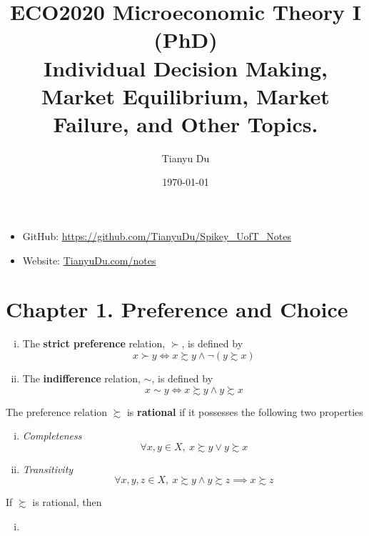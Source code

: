 \documentclass{article}
\title{ECO2020 Microeconomic Theory I (PhD) \\ \small Individual Decision Making, Market Equilibrium, Market Failure, and Other Topics.}
\date{\today}
\author{Tianyu Du}
\begin{document}
	\maketitle
	\doclicenseThis
	\begin{itemize}
		\item GitHub: \url{https://github.com/TianyuDu/Spikey_UofT_Notes}
		\item Website: \url{TianyuDu.com/notes}
	\end{itemize}
	\tableofcontents
	\newpage
	
	\section{Chapter 1. Preference and Choice}
		\begin{definition} \quad
			\begin{enumerate}[(i)]
				\item The \textbf{strict preference} relation, $\succ$, is defined by
					\begin{equation}
						x \succ y \iff x \succsim y \land \neg (y \succsim x)
					\end{equation}
				\item The \textbf{indifference} relation, $\sim$, is defined by
					\begin{equation}
						x \sim y \iff x \succsim y \land y \succsim x
					\end{equation}
			\end{enumerate}
		\end{definition}
	
		\begin{definition}[1.B.1]
			The preference relation $\succsim$ is \textbf{rational} if it possesses the following two properties
			\begin{enumerate}[(i)]
				\item \emph{Completeness} 
					\begin{equation}
						\forall x, y \in X,\ x \succsim y \lor y \succsim x
					\end{equation}
				\item \emph{Transitivity}
					\begin{equation}
						\forall x, y, z \in X,\ x \succsim y \land y \succsim z \implies x \succsim z
					\end{equation}
			\end{enumerate}
		\end{definition}
	
		\begin{proposition}[1.B.1]
			If $\succsim$ is rational, then
			\begin{enumerate}[(i)]
				\item 
			\end{enumerate}
		\end{proposition}
\end{document}
